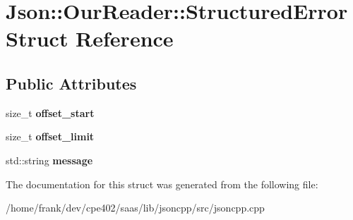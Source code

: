 \hypertarget{struct_json_1_1_our_reader_1_1_structured_error}{}\section{Json\+:\+:Our\+Reader\+:\+:Structured\+Error Struct Reference}
\label{struct_json_1_1_our_reader_1_1_structured_error}
\subsection*{Public Attributes}
\begin{DoxyCompactItemize}
\item 
\hypertarget{struct_json_1_1_our_reader_1_1_structured_error_a4eec161c2a6b4c89b6eb3d8d83834443}{}size\+\_\+t {\bfseries offset\+\_\+start}\label{struct_json_1_1_our_reader_1_1_structured_error_a4eec161c2a6b4c89b6eb3d8d83834443}

\item 
\hypertarget{struct_json_1_1_our_reader_1_1_structured_error_a6bab2650e5230fc15427b309de79fdbe}{}size\+\_\+t {\bfseries offset\+\_\+limit}\label{struct_json_1_1_our_reader_1_1_structured_error_a6bab2650e5230fc15427b309de79fdbe}

\item 
\hypertarget{struct_json_1_1_our_reader_1_1_structured_error_adc8a757b6452cc6ab14fb90b933b3414}{}std\+::string {\bfseries message}\label{struct_json_1_1_our_reader_1_1_structured_error_adc8a757b6452cc6ab14fb90b933b3414}

\end{DoxyCompactItemize}


The documentation for this struct was generated from the following file\+:\begin{DoxyCompactItemize}
\item 
/home/frank/dev/cpe402/saas/lib/jsoncpp/src/jsoncpp.\+cpp\end{DoxyCompactItemize}
